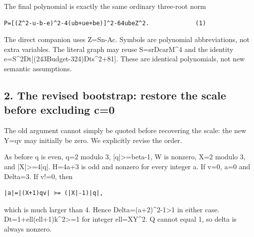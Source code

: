 The final polynomial is exactly the same ordinary three-root norm



\begin{verbatim}
P=[(Z^2-u-b-e)^2-4(ub+ue+be)]^2-64ubeZ^2.             (1)
\end{verbatim}

The direct companion uses Z=\allowbreak{}Sn-Ac. Symbols are polynomial abbreviations, not extra variables. The literal graph may reuse S=\allowbreak{}sr\textasteriskcentered{}\allowbreak{}Dcar\textasteriskcentered{}\allowbreak{}M\textasciicircum{}\allowbreak{}4 and the identity e=\allowbreak{}S\textasciicircum{}\allowbreak{}2\textasteriskcentered{}\allowbreak{}Dt\textasteriskcentered{}\allowbreak{}[(243Budget-324)\textasteriskcentered{}\allowbreak{}Dt\textasteriskcentered{}\allowbreak{}s\textasciicircum{}\allowbreak{}2+\allowbreak{}81]. These are identical polynomials, not new semantic assumptions.



\subsection*{2. The revised bootstrap: restore the scale before excluding c=\allowbreak{}0}



The old argument cannot simply be quoted before recovering the scale: the new Y=\allowbreak{}qv may initially be zero. We explicitly revise the order.



As before q is even, q=\allowbreak{}2 modulo 3, |q|\textgreater{}\allowbreak{}=\allowbreak{}beta-1, W is nonzero, X=\allowbreak{}2 modulo 3, and |X|\textgreater{}\allowbreak{}=\allowbreak{}4|q|. H=\allowbreak{}4a+\allowbreak{}3 is odd and nonzero for every integer a. If v=\allowbreak{}0, a=\allowbreak{}0 and Delta=\allowbreak{}3. If v!=\allowbreak{}0, then



\begin{verbatim}
|a|=|(X+1)qv| >= (|X|-1)|q|,
\end{verbatim}

which is much larger than 4. Hence Delta=\allowbreak{}(a+\allowbreak{}2)\textasciicircum{}\allowbreak{}2-1\textgreater{}\allowbreak{}1 in either case. Dt=\allowbreak{}1+\allowbreak{}ell(ell+\allowbreak{}1)k\textasciicircum{}\allowbreak{}2\textgreater{}\allowbreak{}=\allowbreak{}1 for integer ell=\allowbreak{}XY\textasciicircum{}\allowbreak{}2. Q cannot equal 1, so delta is always nonzero.



